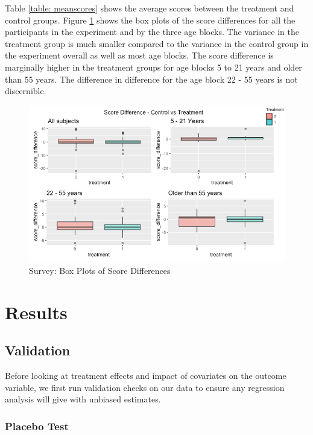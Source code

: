 \documentclass[journal,onecolumn, 12pt]{article}
\begin{document}
\noindent
Table \ref{table: meanscores} shows the average scores between the treatment and control groups. Figure \ref{fig: ScoreDiff} shows the box plots of the score differences for all the participants in the experiment and by the three age blocks. The variance in the treatment group is much smaller compared to the variance in the control group in the experiment overall as well as most age blocks. The score difference is marginally higher in the treatment groups for age blocks 5 to 21 years and older than 55 years. The difference in difference for the age block 22 - 55 years is not discernible. 

\begin{figure}[h]
    \centering
    \includegraphics[width=\columnwidth]{images/ScoreDiff2.png}
    \caption{Survey: Box Plots of Score Differences}
    \label{fig: ScoreDiff}
\end{figure}

\section {Results}

\subsection {Validation}

Before looking at treatment effects and impact of covariates on the outcome variable, we first run validation checks on our data to ensure any regression analysis will give with unbiased estimates.

\subsubsection {Placebo Test}
\end{document}
